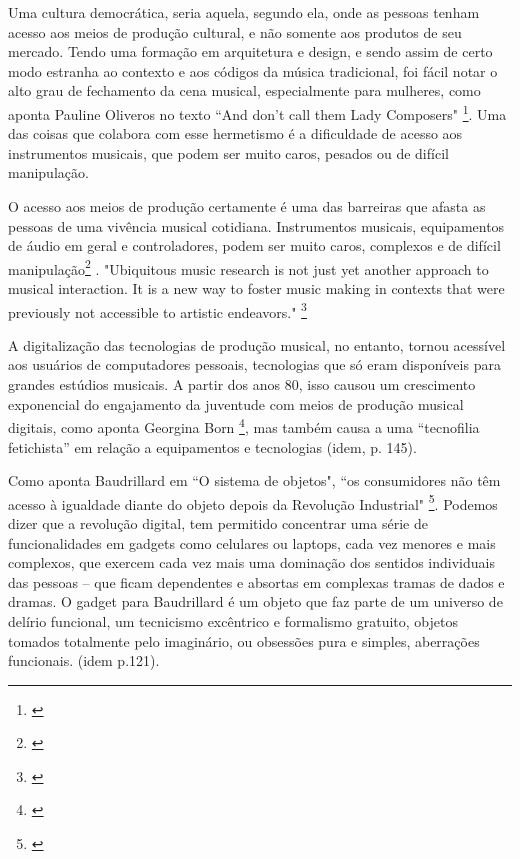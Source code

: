 Uma cultura democrática, seria aquela, segundo ela, onde as pessoas tenham acesso aos meios de produção cultural, e não somente aos produtos de seu mercado. Tendo uma formação em arquitetura e design, e sendo assim de certo modo estranha ao contexto e aos códigos da música tradicional, foi fácil notar o alto grau de fechamento da cena musical, especialmente para mulheres, como aponta Pauline Oliveros no texto ``And don't call them Lady Composers" \footnote{\cite[48]{Oliveros2012}}. Uma das coisas que colabora com esse hermetismo é a dificuldade de acesso aos instrumentos musicais, que podem ser muito caros, pesados ou de difícil manipulação. 



O acesso aos meios de produção certamente é uma das barreiras que afasta as pessoas de uma vivência musical cotidiana. Instrumentos musicais, equipamentos de áudio em geral e controladores, podem ser muito caros, complexos e de difícil manipulação\footnote{\cite{Fiebrink2007}} . "Ubiquitous music research is not just yet
another approach to musical interaction. It is a new way to foster music making in contexts
that were previously not accessible to artistic endeavors." \footnote{\cite{Keller2018}}

A digitalização das tecnologias de produção musical, no entanto, tornou acessível aos usuários de computadores pessoais, tecnologias que só eram disponíveis para grandes estúdios musicais. A partir dos anos 80, isso causou um crescimento exponencial do engajamento da juventude com meios de produção musical digitais, como aponta Georgina Born \footnote{\cite[143]{Born2015}}, mas também causa a uma ``tecnofilia fetichista'' em relação a equipamentos e tecnologias (idem, p. 145).

Como aponta Baudrillard em ``O sistema de objetos", ``os consumidores não têm acesso à igualdade diante do objeto depois da Revolução Industrial" \footnote{\cite[162]{Baudrillard2012}}. Podemos dizer que a revolução digital, tem permitido concentrar uma série de funcionalidades em gadgets como celulares ou laptops, cada vez menores e mais complexos, que exercem cada vez mais uma dominação dos sentidos individuais das pessoas – que ficam dependentes e absortas em complexas tramas de dados e dramas. O gadget para Baudrillard é um objeto que faz parte de um universo de delírio funcional, um tecnicismo excêntrico e formalismo gratuito, objetos tomados totalmente pelo imaginário, ou obsessões pura e simples, aberrações funcionais. (idem p.121). 


